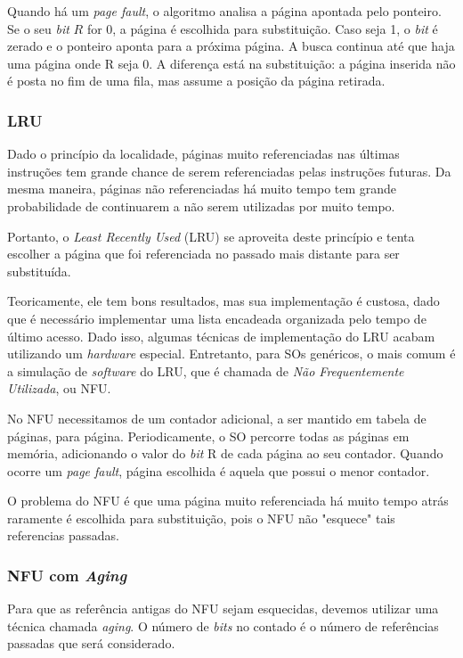 Quando há um \textit{page fault}, o algoritmo analisa a página apontada pelo ponteiro. Se o seu \textit{bit} $R$ for 0, a página é escolhida para substituição. Caso seja 1, o \textit{bit} é zerado e o ponteiro aponta para a próxima página. A busca continua até que haja uma página onde R seja 0. A diferença está na substituição: a página inserida não é posta no fim de uma fila, mas assume a posição da página retirada.



\subsubsection{LRU}
Dado o princípio da localidade, páginas muito referenciadas nas últimas instruções tem grande chance de serem referenciadas pelas instruções futuras. Da mesma maneira, páginas não referenciadas há muito tempo tem grande probabilidade de continuarem a não serem utilizadas por muito tempo.

Portanto, o \textit{Least Recently Used} (LRU) se aproveita deste princípio e tenta escolher a página que foi referenciada no passado mais distante para ser substituída.

Teoricamente, ele tem bons resultados, mas sua implementação é custosa, dado que é necessário implementar uma lista encadeada organizada pelo tempo de último acesso. Dado isso, algumas técnicas de implementação do LRU acabam utilizando um \textit{hardware} especial. Entretanto, para SOs genéricos, o mais comum é a simulação de \textit{software} do LRU, que é chamada de \textit{Não Frequentemente Utilizada}, ou NFU.

No NFU necessitamos de um contador adicional, a ser mantido em tabela de páginas, para página. Periodicamente, o SO percorre todas as páginas em memória, adicionando o valor do \textit{bit} R de cada página ao seu contador. Quando ocorre um \textit{page fault}, página escolhida é aquela que possui o menor contador.

O problema do NFU é que uma página muito referenciada há muito tempo atrás raramente é escolhida para substituição, pois o NFU não "esquece" tais referencias passadas.


\subsubsection{NFU com \textit{Aging}}
Para que as referência antigas do NFU sejam esquecidas, devemos utilizar uma técnica chamada \textit{aging}. O número de \textit{bits} no contado é o número de referências passadas que será considerado.

